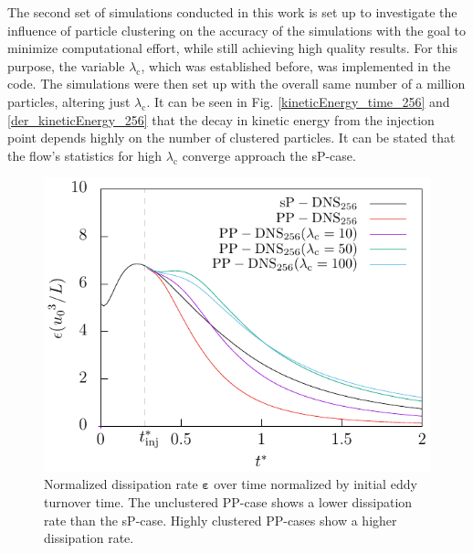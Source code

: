 \documentclass[11pt,a4paper,openany,oneside,parskip=half*]{article}
\renewcommand*\vec[1]{\boldsymbol{#1}}
\begin{document}
\newline
The second set of simulations conducted in this work is set up to investigate the influence of particle clustering on the accuracy of the simulations with the goal to minimize computational effort, while still achieving high quality results. For this purpose, the variable $\lambda_\mathrm{c}$, which was established before, was implemented in the code. The simulations were then set up with the overall same number of a million particles, altering just $\lambda_\mathrm{c}$. It can be seen in Fig. \ref{kineticEnergy_time_256} and \ref{der_kineticEnergy_256} that the decay in kinetic energy from the injection point depends highly on the number of clustered particles. It can be stated that the flow's statistics for high $\lambda_\mathrm{c}$ converge approach the sP-case. 
\begin{figure}[h]
    \centering
    \begin{minipage}[t]{0.5\textwidth}
         \centering
        \includegraphics[width=\linewidth]{./Abbildungen/256/diss_time.pdf}
        \caption{Normalized dissipation rate $\vec{\varepsilon}$ over time normalized by initial eddy turnover time. The unclustered PP-case shows a lower dissipation rate than the sP-case. Highly clustered PP-cases show a higher dissipation rate.}
        \label{diss_time_256}
    \end{minipage}%
    \begin{minipage}[t]{0.5\textwidth}
        \centering

\end{minipage}
\end{figure}
\end{document}
